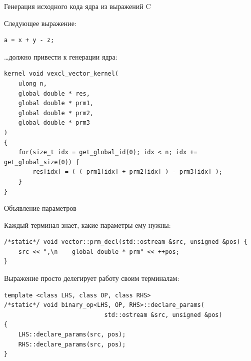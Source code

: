 \documentclass[@BEAMER_OPTIONS@]{beamer}
\newcommand{\CXX}{{\rm C}\plusplus}
\begin{document}
\begin{frame}[fragile]{Генерация исходного кода ядра из выражений \CXX}
    \begin{exampleblock}{Следующее выражение:}
        \begin{lstlisting}
a = x + y - z;
        \end{lstlisting}
    \end{exampleblock}
    \begin{exampleblock}{\ldots должно привести к генерации ядра:}
        \begin{lstlisting}
kernel void vexcl_vector_kernel(
    ulong n,
    global double * res,
    global double * prm1,
    global double * prm2,
    global double * prm3
)
{
    for(size_t idx = get_global_id(0); idx < n; idx += get_global_size(0)) {
        res[idx] = ( ( prm1[idx] + prm2[idx] ) - prm3[idx] );
    }
}
        \end{lstlisting}
    \end{exampleblock}
\end{frame}

\begin{frame}[fragile]{Объявление параметров}
    \begin{exampleblock}{Каждый терминал знает, какие параметры ему нужны:}
        \begin{lstlisting}
/*static*/ void vector::prm_decl(std::ostream &src, unsigned &pos) {
    src << ",\n    global double * prm" << ++pos;
}
        \end{lstlisting}
    \end{exampleblock}
    \begin{exampleblock}{Выражение просто делегирует работу своим терминалам:}
        \begin{lstlisting}[firstnumber=last]
template <class LHS, class OP, class RHS>
/*static*/ void binary_op<LHS, OP, RHS>::declare_params(
                            std::ostream &src, unsigned &pos)
{
    LHS::declare_params(src, pos);
    RHS::declare_params(src, pos);
}
        \end{lstlisting}
    \end{exampleblock}
\end{frame}
\end{document}
